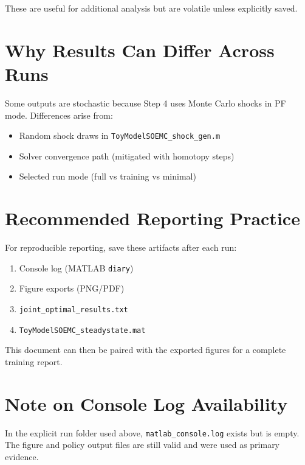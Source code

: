 \documentclass[11pt]{article}
\begin{document}
These are useful for additional analysis but are volatile unless explicitly saved.

\section{Why Results Can Differ Across Runs}
Some outputs are stochastic because Step 4 uses Monte Carlo shocks in PF mode.
Differences arise from:
\begin{itemize}
\item Random shock draws in \texttt{ToyModelSOEMC\_shock\_gen.m}
\item Solver convergence path (mitigated with homotopy steps)
\item Selected run mode (full vs training vs minimal)
\end{itemize}

\section{Recommended Reporting Practice}
For reproducible reporting, save these artifacts after each run:
\begin{enumerate}
\item Console log (MATLAB \texttt{diary})
\item Figure exports (PNG/PDF)
\item \texttt{joint\_optimal\_results.txt}
\item \texttt{ToyModelSOEMC\_steadystate.mat}
\end{enumerate}

This document can then be paired with the exported figures for a complete training report.

\section{Note on Console Log Availability}
In the explicit run folder used above, \texttt{matlab\_console.log} exists but is empty.
The figure and policy output files are still valid and were used as primary evidence.
\end{document}
